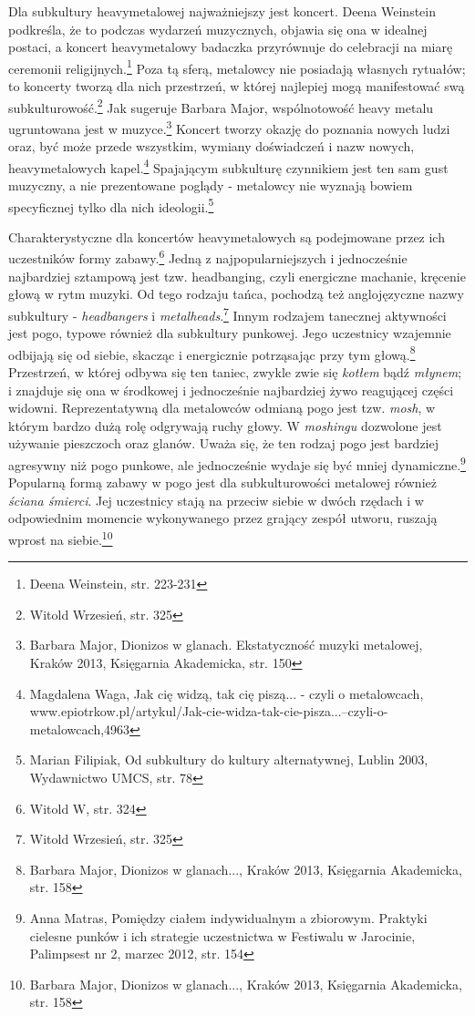 \documentclass[12pt, a4paper, titlepage]{report}
\begin{document}
Dla subkultury heavymetalowej najważniejszy jest koncert. Deena Weinstein podkreśla, że to podczas wydarzeń muzycznych, objawia się ona w idealnej postaci, a koncert heavymetalowy badaczka przyrównuje do celebracji na miarę ceremonii religijnych.\footnote{Deena Weinstein, str. 223-231} Poza tą sferą, metalowcy nie posiadają własnych rytuałów; to koncerty tworzą dla nich przestrzeń, w której najlepiej mogą manifestować swą subkulturowość.\footnote{Witold Wrzesień, str. 325} Jak sugeruje Barbara Major, wspólnotowość heavy metalu ugruntowana jest w muzyce.\footnote{Barbara Major, Dionizos w glanach. Ekstatyczność muzyki metalowej, Kraków 2013, Księgarnia Akademicka, str. 150} Koncert tworzy okazję do poznania nowych ludzi oraz, być może przede wszystkim, wymiany doświadczeń i nazw nowych, heavymetalowych kapel.\footnote{Magdalena Waga, Jak cię widzą, tak cię piszą... - czyli o metalowcach, www.epiotrkow.pl\break /artykul/Jak-cie-widza-tak-cie-pisza...--czyli-o-metalowcach,4963} Spajającym subkulturę czynnikiem jest ten sam gust muzyczny, a nie prezentowane poglądy - metalowcy nie wyznają bowiem specyficznej tylko dla nich ideologii.\footnote{Marian Filipiak, Od subkultury do kultury alternatywnej, Lublin 2003, Wydawnictwo UMCS, str. 78}

Charakterystyczne dla koncertów heavymetalowych są podejmowane przez ich uczestników formy zabawy.\footnote{Witold W, str. 324} Jedną z najpopularniejszych i jednocześnie najbardziej sztampową jest tzw. headbanging, czyli energiczne machanie, kręcenie głową w rytm muzyki. Od tego rodzaju tańca, pochodzą też anglojęzyczne nazwy subkultury - \textit{headbangers} i \textit{metalheads}.\footnote{Witold Wrzesień, str. 325} Innym rodzajem tanecznej aktywności jest pogo, typowe również dla subkultury punkowej. Jego uczestnicy wzajemnie odbijają się od siebie, skacząc i energicznie potrząsając przy tym głową.\footnote{Barbara Major, Dionizos w glanach..., Kraków 2013, Księgarnia Akademicka, str. 158} Przestrzeń, w której odbywa się ten taniec, zwykle zwie się \textit{kotłem} bądź \textit{młynem}; i znajduje się ona w środkowej i jednocześnie najbardziej żywo reagującej części widowni. Reprezentatywną dla metalowców odmianą pogo jest tzw. \textit{mosh}, w którym bardzo dużą rolę odgrywają ruchy głowy. W \textit{moshingu} dozwolone jest używanie pieszczoch oraz glanów. Uważa się, że ten rodzaj pogo jest bardziej agresywny niż pogo punkowe, ale jednocześnie wydaje się być mniej dynamiczne.\footnote{Anna Matras, Pomiędzy ciałem indywidualnym a zbiorowym. Praktyki cielesne punków i ich strategie uczestnictwa w Festiwalu w Jarocinie, Palimpsest nr 2, marzec 2012, str. 154} Popularną formą zabawy w pogo jest dla subkulturowości metalowej również \textit{ściana śmierci}. Jej uczestnicy stają na przeciw siebie w dwóch rzędach i w odpowiednim momencie wykonywanego przez grający zespół utworu, ruszają wprost na siebie.\footnote{Barbara Major, Dionizos w glanach..., Kraków 2013, Księgarnia Akademicka, str. 158} 
\end{document}
